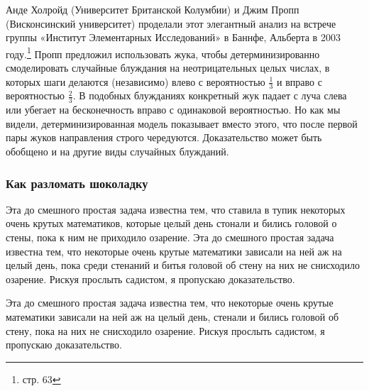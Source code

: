 Анде Холройд (Университет Британской Колумбии) и Джим Пропп (Висконсинский университет) проделали этот элегантный анализ на встрече группы «Институт Элементарных Исследований» в Баннфе, Альберта в 2003 году.\footnote{\href{https://www.birs.ca/files/scientific-reports/BIRS_SR_2003.pdf}{} стр. 63}
Пропп предложил использовать жука, чтобы детерминизированно смоделировать случайные блуждания на неотрицательных целых числах, в которых шаги делаются (независимо) влево с вероятностью $\tfrac13$ и вправо с вероятностью $\tfrac23$.
В подобных блужданиях конкретный жук падает с луча слева или убегает на бесконечность вправо с одинаковой вероятностью.
Но как мы видели, детерминизированная модель показывает вместо этого, что после первой пары жуков направления строго чередуются.
Доказательство может быть обобщено и на другие виды случайных блужданий.

\subsubsection*{Как разломать шоколадку}%

Эта до смешного простая задача известна тем, что ставила в тупик некоторых очень крутых математиков, которые целый день стонали и бились головой о стены, пока к ним не приходило озарение.
Эта до смешного простая задача известна тем, что некоторые очень крутые математики зависали на ней аж на целый день, пока среди стенаний и битья головой об стену на них не снисходило озарение.
Рискуя прослыть садистом, я пропускаю доказательство.

Эта до смешного простая задача известна тем, что некоторые очень крутые математики зависали на ней аж на целый день, стенали и бились головой об стену, пока на них не снисходило озарение.
Рискуя прослыть садистом, я пропускаю доказательство.
